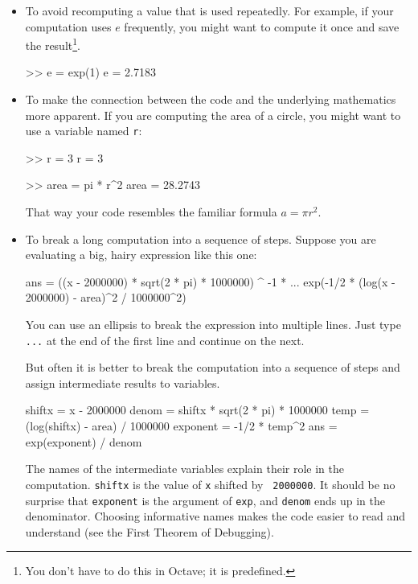 \documentclass[
]{book}
\numberwithin{Answer}{chapter}
\numberwithin{Exercise}{chapter}
\begin{document}
\begin{itemize}

\item To avoid recomputing a value that is used repeatedly.  For
example, if your computation uses $e$ frequently, you might
want to compute it once and save the result\footnote{You don't have to do this in Octave; it is predefined.}.

\begin{code}
>> e = exp(1)
e = 2.7183
\end{code}

\item To make the connection between the code and the underlying
mathematics more apparent.  If you are computing the area of a circle,
you might want to use a variable named {\tt r}:

\begin{code}
>> r = 3
r = 3

>> area = pi * r^2
area = 28.2743
\end{code}

That way your code resembles the familiar formula $a = \pi r^2$.

\item To break a long computation into a sequence of steps.
Suppose you are evaluating a big, hairy expression like this one:
\begin{code}
ans = ((x - 2000000) * sqrt(2 * pi) * 1000000) ^ -1 * ...
exp(-1/2 * (log(x - 2000000) - area)^2 / 1000000^2)
\end{code}

You can use an ellipsis to break the expression into multiple lines.
Just type {\tt ...} at the end of the first line and continue on the
next.

But often it is better to break the computation into a sequence of
steps and assign intermediate results to variables.

\begin{code}
shiftx = x - 2000000
denom = shiftx * sqrt(2 * pi) * 1000000
temp = (log(shiftx) - area) / 1000000
exponent = -1/2 * temp^2
ans = exp(exponent) / denom
\end{code}

The names of the intermediate variables explain their role in the
computation.  {\tt shiftx} is the value of {\tt x} shifted by {\tt
2000000}.  It should be no surprise that {\tt exponent} is the argument
of {\tt exp}, and {\tt denom} ends up in the denominator.  Choosing
informative names makes the code easier to read and understand (see
the First Theorem of Debugging).

\end{itemize}
\end{document}
